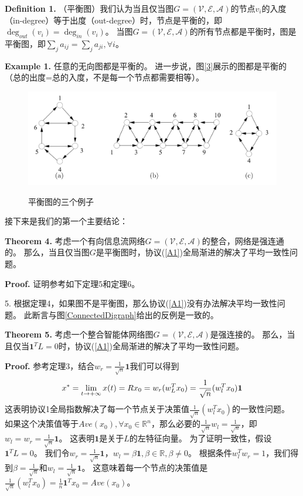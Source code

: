 \documentclass{article}
\begin{document}
\noindent \textbf{Definition 1.} （平衡图）我们认为当且仅当图$G=(\mathcal{V}, \mathcal{E}, \mathcal{A})$的节点$v_i$的入度（in-degree）等于出度（out-degree）时，节点是平衡的，即$\deg_{out}(v_i)=\deg_{in}(v_i)$。
当图$G=(\mathcal{V}, \mathcal{E}, \mathcal{A})$的所有节点都是平衡时，图是平衡图，即$\sum_{j}a_{ij} = \sum_{j}a_{ji}, \forall i$。

\noindent \textbf{Example 1.} 任意的无向图都是平衡的。
进一步说，图\ref{3}展示的图都是平衡的{\color{userColor}（总的出度=总的入度，不是每一个节点都需要相等）}。
\begin{figure}[htbp]
    \centering
    \includegraphics[width=12cm]{figures/Fig3-BalancedGraphs.jpeg}
    \label{BalancedGraphs}
    \caption{平衡图的三个例子}
\end{figure}

接下来是我们的第一个主要结论：

\noindent \textbf{Theorem 4.} 考虑一个有向信息流网络$G=(\mathcal{V}, \mathcal{E}, \mathcal{A})$的整合，网络是强连通的。
那么，当且仅当图$G$是平衡图时，协议(\ref{A1})全局渐进的解决了平均一致性问题。

\noindent \textbf{Proof.} 证明参考如下定理5和定理6。

 5. 根据定理4，如果图不是平衡图，那么协议(\ref{A1})没有办法解决平均一致性问题。
此断言与图\ref{ConnectedDigraph}给出的反例是一致的。

\noindent \textbf{Theorem 5.} 考虑一个整合智能体网络图$G=(\mathcal{V}, \mathcal{E}, \mathcal{A})$是强连接的。
那么，当且仅当$\mathbf{1}^TL=0$时，协议(\ref{A1})全局渐进的解决了平均一致性问题。

\noindent \textbf{Proof.} 参考定理3，结合$w_r = \frac{1}{\sqrt{n}}\mathbf{1}$我们可以得到
\begin{equation}
    x^* = \lim_{t\rightarrow +\infty}x(t) = Rx_0 = w_r(w_L^T x_0) = \frac{1}{\sqrt{n}}(w_l^Tx_0)\mathbf{1}
    \notag
\end{equation}
这表明协议1全局指数解决了每一个节点关于决策值$\frac{1}{\sqrt{n}}(w_l^Tx_0)$的一致性问题。
如果这个决策值等于$Ave(x_0), \forall x_0 \in \mathbb{R}^n$，那么必要的$\frac{1}{\sqrt{n}}w_l = \frac{1}{\sqrt{n}}$，即$w_l= w_r=\frac{1}{\sqrt{n}}\mathbf{1}$。
这表明$\mathbf{1}$是关于$L$的左特征向量。
为了证明一致性，假设$\mathbf{1}^TL=0$。
我们令$w_r=\frac{1}{\sqrt{n}}\mathbf{1}$，$w_l=\beta\mathbf{1},\beta\in\mathbb{R},\beta\ne0$。
根据条件$w_l^Tw_r=1$，我们得到$\beta=\frac{1}{\sqrt{n}}$和$w_l=\frac{1}{\sqrt{n}}\mathbf{1}$。
这意味着每一个节点的决策值是$\frac{1}{\sqrt{n}}(w_l^Tx_0)=\frac{1}{n}\mathbf{1}^Tx_0=Ave(x_0)$。
\end{document}
